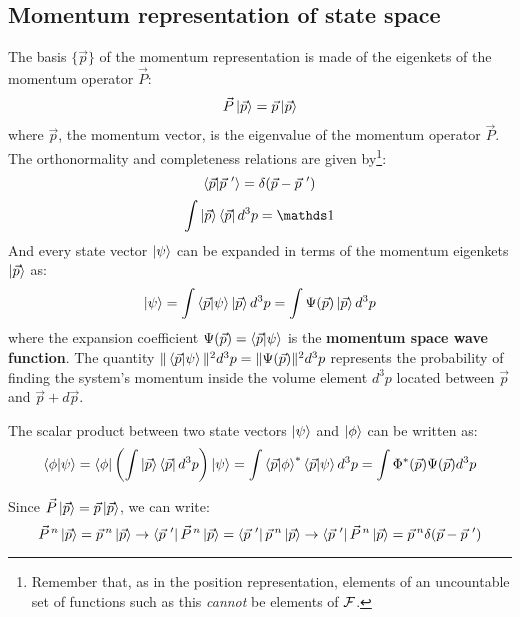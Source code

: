 \subsection{Momentum representation of state space}

The basis $\{\vec{p}\}$ of the momentum representation is made of the eigenkets of the momentum operator $\vec{P}$:
\begin{equation}
    \vec{P}\ket{\vec{p}} = \vec{p}\ket{\vec{p}}
\end{equation}
where $\vec{p}$, the momentum vector, is the eigenvalue of the momentum operator $\vec{P}$. The orthonormality and completeness relations are given by\footnote{Remember that, as in the position representation, elements of an uncountable set of functions such as this \textit{cannot} be elements of $\mathcal{F}$.}:
\begin{equation}
    \braket{\vec{p}|\vec{p}\ '} = \delta(\vec{p} - \vec{p}\ ')
\end{equation}
\begin{equation}
    \int \ket{\vec{p}}\bra{\vec{p}} d^3p = \Imat
\end{equation}
And every state vector $\ket{\psi}$ can be expanded in terms of the momentum eigenkets $\ket{\vec{p}}$ as:
\begin{equation}
    \ket{\psi} = \int \braket{\vec{p}|\psi} \ket{\vec{p}} d^3 p = \int \Psi(\vec{p}) \ket{\vec{p}} d^3 p
\end{equation}
where the expansion coefficient $\Psi(\vec{p}) = \braket{\vec{p}|\psi}$ is the \textbf{momentum space wave function}. The quantity $\|\braket{\vec{p}|\psi}\|^2d^3 p = \|\Psi(\vec{p})\|^2d^3p$ represents the probability of finding the system's momentum inside the volume element $d^3p$ located between $\vec{p}$ and $\vec{p} + d\vec{p}$.

The scalar product between two state vectors $\ket{\psi}$ and $\ket{\phi}$ can be written as:
\begin{equation}
    \braket{\phi|\psi} = \bra{\phi}\left(\int \ket{\vec{p}}\bra{\vec{p}}d^3p\right)\ket{\psi} = \int \braket{\vec{p}|\phi}^*\braket{\vec{p}|\psi} d^3p = \int \Phi^*(\vec{p})\Psi(\vec{p}) d^3p
\end{equation}

Since $\vec{P}\ket{\vec{p}} = \vec{p}\ket{\vec{p}}$, we can write:
\begin{equation}
    \vec{P}^{\, n}\ket{\vec{p}} = \vec{p}\, ^n\ket{\vec{p}} \to \bra{\vec{p}\ '}\vec{P}^{\, n}\ket{\vec{p}} = \bra{\vec{p}\ '}\vec{p}\, ^n\ket{\vec{p}} \to \bra{\vec{p}\ '}\vec{P}^{\, n}\ket{\vec{p}} = \vec{p}\, ^n\delta(\vec{p} - \vec{p}\ ')
\end{equation}




